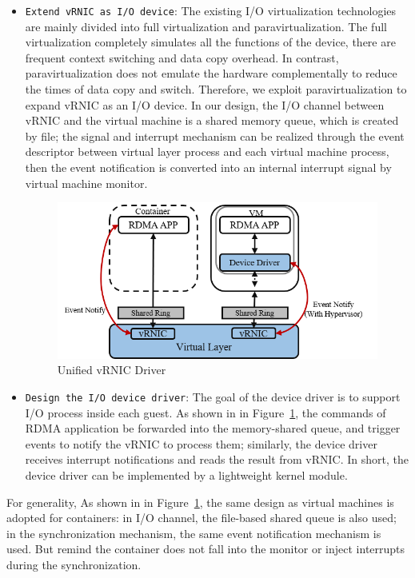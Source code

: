 \begin{itemize}
	\item {\verb|Extend vRNIC as I/O device|}: 
	The existing I/O virtualization technologies are mainly divided into full virtualization and paravirtualization. The full virtualization completely simulates all the functions of the device, there are frequent context switching and data copy overhead. 
	In contrast, paravirtualization does not emulate the hardware complementally to reduce the times of data copy and switch. Therefore, we exploit paravirtualization to expand vRNIC as an I/O device. In our design, the I/O channel between vRNIC and the virtual machine is a shared memory queue, which is created by file; the signal and interrupt mechanism can be realized through the event descriptor between virtual layer process and each virtual machine process, then the event notification is converted into an internal interrupt signal by virtual machine monitor.
	
	\begin{figure}[!ht]
		\centering
		\includegraphics[width=1.0\linewidth]{images/interface-general}
		\caption{Unified vRNIC Driver}
		\label{fig:vrnic-driver}
	\end{figure}
	
	\item {\verb|Design the I/O device driver|}:
	The goal of the device driver is to support I/O process inside each guest. As shown in in Figure~\ref{fig:vrnic-driver},  the commands of RDMA application be forwarded into the memory-shared queue, and trigger events to notify the vRNIC to process them; similarly, the device driver receives interrupt notifications and reads the result from vRNIC. In short, the device driver can be implemented by a lightweight kernel module.
	
\end{itemize}

For generality, As shown in in Figure~\ref{fig:vrnic-driver}, the same design as virtual machines is adopted for containers: in I/O channel, the file-based shared queue is also used; in the synchronization mechanism, the same event notification mechanism is used. But remind the container does not fall into the monitor or inject interrupts during the synchronization.

